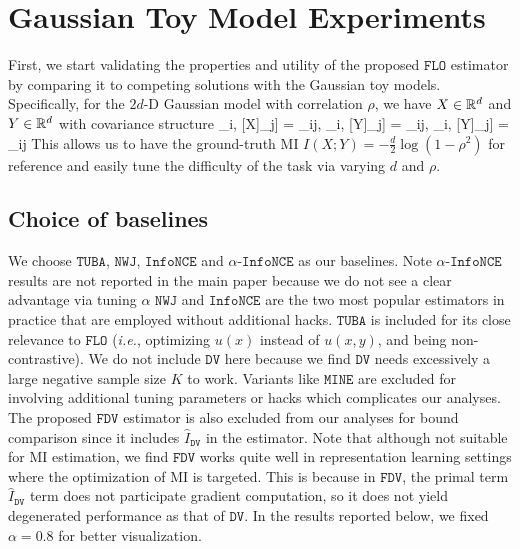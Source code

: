 \documentclass{article}
\theoremstyle{plain}
\theoremstyle{definition}
\theoremstyle{remark}
\newcommand{\infonce}{\texttt{InfoNCE}}
\newcommand{\TUBA}{\texttt{TUBA}}
\newcommand{\NWJ}{\texttt{NWJ}}
\newcommand{\DV}{\texttt{DV}}
\newcommand{\MINE}{\texttt{MINE}}
\newcommand{\FLO}{\texttt{FLO}}
\newcommand{\FDV}{\texttt{FDV}}
\begin{document}
		\section{Gaussian Toy Model Experiments}
		
		First, we start validating the properties and utility of the proposed $\FLO$ estimator by comparing it to competing solutions with the Gaussian toy models. Specifically, for the $2d$-D Gaussian model with correlation $\rho$, we have $X \in \mathbb{R}^d$ and $Y \in \mathbb{R}^d$ with covariance structure 
		\beq
		\cov[[X]_i, [X]_j] = \delta_{ij}, \cov[[Y]_i, [Y]_j] = \delta_{ij}, \cov[[X]_i, [Y]_j] = \delta_{ij}\cdot\rho
		\eeq
		This allows us to have the ground-truth MI $I(X;Y) = -\frac{d}{2} \log (1-\rho^2)$ for reference and easily tune the difficulty of the task via varying $d$ and $\rho$.
		
		
		
		\subsection{Choice of baselines}
		
		We choose $\TUBA$, $\NWJ$, $\infonce$ and $\alpha$-$\infonce$ as our baselines. 
		Note $\alpha$-$\infonce$ results are not reported in the main paper because we do not see a clear advantage via tuning $\alpha$
		$\NWJ$ and $\infonce$ are the two most popular estimators in practice that are employed without additional hacks. $\TUBA$ is included for its close relevance to $\FLO$ ({\it i.e.}, optimizing $u(x)$ instead of $u(x,y)$, and being non-contrastive). We do not include $\DV$ here because we find $\DV$ needs excessively a large negative sample size $K$ to work. Variants like $\MINE$ are excluded for involving additional tuning parameters or hacks which complicates our analyses. The proposed $\FDV$ estimator is also excluded from our analyses for bound comparison since it includes $\hat{I}_{\DV}$ in the estimator. Note that although not suitable for MI estimation, we find $\FDV$ works quite well in representation learning settings where the optimization of MI is targeted. This is because in $\FDV$, the primal term $\hat{I}_{\DV}$ term does not participate gradient computation, so it does not yield degenerated performance as that of $\DV$. In the results reported below, we fixed $\alpha=0.8$ for better visualization. 
		
\end{document}
